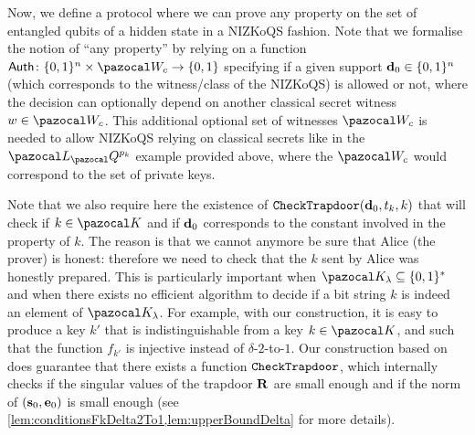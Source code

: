 Now, we define a protocol where we can prove any property on the set of entangled qubits of a hidden \GHZ{} state in a NIZKoQS fashion. Note that we formalise the notion of ``any property'' by relying on a function $\Auth\colon \{0,1\}^n \times \cW_c \rightarrow \{0,1\}$ specifying if a given support $\mathbf{d}_0 \in \{0,1\}^n$ (which corresponds to the witness/class of the NIZKoQS) is allowed or not, where the decision can optionally depend on another classical secret witness $w \in \cW_c$. This additional optional set of witnesses $\cW_c$ is needed to allow NIZKoQS relying on classical secrets like in the $\cL_\cQ^{p_k}$ example provided above, where the $\cW_c$ would correspond to the set of private keys.

\begin{remark}\label{rq:whyHonestTrapdoor}
  Note that we also require here the existence of ${\tt CheckTrapdoor}(\mathbf{d}_0,t_k,k)$ that will check if $k \in \cK$ and if $\mathbf{d}_0$ corresponds to the constant involved in the \XOR{} property of $k$. The reason is that we cannot anymore be sure that Alice (the prover) is honest: therefore we need to check that the $k$ sent by Alice was honestly prepared. This is particularly important when $\cK_{\lambda} \subseteq \{0,1\}^*$ and when there exists no efficient algorithm to decide if a bit string $k$ is indeed an element of $\cK_{\lambda}$. For example, with our construction, it is easy to produce a key $k'$ that is indistinguishable from a key $k \in \cK$, and such that the function $f_{k'}$ is injective instead of $\delta$-$2$-to-$1$. Our construction based on \LWE{} does guarantee that there exists a function ${\tt CheckTrapdoor}$, which internally checks if the singular values of the trapdoor $\mathbf{R}$ are small enough and if the norm of $(\mathbf{s}_0,\mathbf{e}_0)$ is small enough (see \cref{lem:conditionsFkDelta2To1,lem:upperBoundDelta} for more details).
\end{remark}

